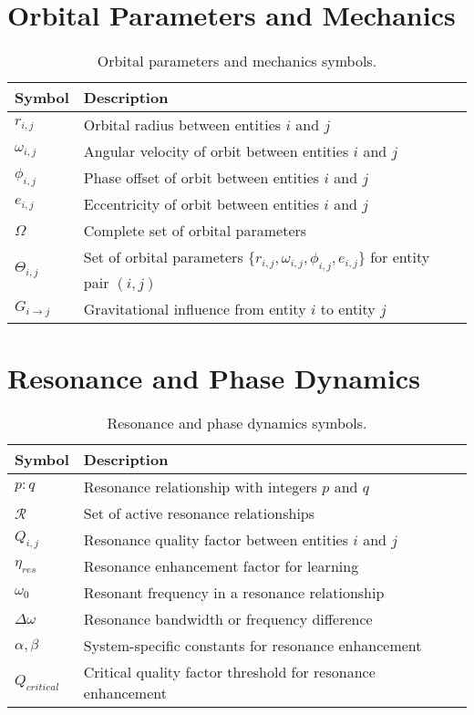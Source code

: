 \section{Orbital Parameters and Mechanics}

\begin{table}[h]
\centering
\begin{tabular}{|l|p{10cm}|}
\hline
\textbf{Symbol} & \textbf{Description} \\
\hline
$r_{i,j}$ & Orbital radius between entities $i$ and $j$ \\
\hline
$\omega_{i,j}$ & Angular velocity of orbit between entities $i$ and $j$ \\
\hline
$\phi_{i,j}$ & Phase offset of orbit between entities $i$ and $j$ \\
\hline
$e_{i,j}$ & Eccentricity of orbit between entities $i$ and $j$ \\
\hline
$\Omega$ & Complete set of orbital parameters \\
\hline
$\Theta_{i,j}$ & Set of orbital parameters $\{r_{i,j}, \omega_{i,j}, \phi_{i,j}, e_{i,j}\}$ for entity pair $(i,j)$ \\
\hline
$G_{i \rightarrow j}$ & Gravitational influence from entity $i$ to entity $j$ \\
\hline
\end{tabular}
\caption{Orbital parameters and mechanics symbols.}
\label{tab:symbols_orbital}
\end{table}

\section{Resonance and Phase Dynamics}

\begin{table}[h]
\centering
\begin{tabular}{|l|p{10cm}|}
\hline
\textbf{Symbol} & \textbf{Description} \\
\hline
$p:q$ & Resonance relationship with integers $p$ and $q$ \\
\hline
$\mathcal{R}$ & Set of active resonance relationships \\
\hline
$Q_{i,j}$ & Resonance quality factor between entities $i$ and $j$ \\
\hline
$\eta_{res}$ & Resonance enhancement factor for learning \\
\hline
$\omega_0$ & Resonant frequency in a resonance relationship \\
\hline
$\Delta \omega$ & Resonance bandwidth or frequency difference \\
\hline
$\alpha, \beta$ & System-specific constants for resonance enhancement \\
\hline
$Q_{critical}$ & Critical quality factor threshold for resonance enhancement \\
\hline
\end{tabular}
\caption{Resonance and phase dynamics symbols.}
\label{tab:symbols_resonance}
\end{table}

